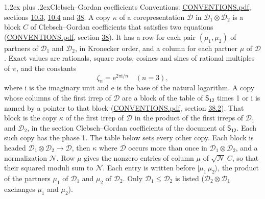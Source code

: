 \documentclass[10pt,a4paper]{article}
\makeatletter
\renewcommand\section{\@startsection{section}{1}{\z@}{-3ex plus -1ex minus -.2ex}%
  {1.2ex plus .2ex}{\normalfont\large\sffamily\bfseries\color{parttitle}}}
\numberwithin{equation}{section}
\newcommand{\grp}[1]{\mathsf{#1}}
\newcommand{\iunit}{\mathrm{i}}
\newcommand{\expe}{\mathrm{e}}
\newcommand{\rootunity}[1]{\zeta_{#1}}
\newcommand{\irrprod}{\otimes}
\newcommand{\mult}{\kappa}
\newcommand{\intx}{\mu}
\newcommand{\cgnorm}{\mathcal{N}}
\newcommand{\prodket}[2]{\lvert {#1}\,{#2}\rangle}
\makeatother
\begin{document}
\section{Clebsch--Gordan coefficients}\label{s:clebsch_gordan}
Conventions: \href{../../CONVENTIONS.pdf}{CONVENTIONS.pdf}, sections \href{../../../rotation/CONVENTIONS.pdf\#conv.10.3}{10.3}, \href{../../../rotation/CONVENTIONS.pdf\#conv.10.4}{10.4} and \href{../../CONVENTIONS.pdf\#conv.38}{38}.
\leavevmode\label{n:index.copy}\label{n:matrix.cg.stored}A copy $\mult$ of a corepresentation $\mathcal{D}$ in $\mathcal{D}_1\irrprod\mathcal{D}_2$ is a block $C$ of Clebsch--Gordan coefficients that satisfies two equations (\href{../../CONVENTIONS.pdf}{CONVENTIONS.pdf}, section \href{../../CONVENTIONS.pdf\#conv.38}{38}). \label{n:index.cg}It has a row for each pair $(\intx_1, \intx_2)$ of partners of $\mathcal{D}_1$ and $\mathcal{D}_2$, in Kronecker order, and a column for each partner $\intx$ of $\mathcal{D}$.
\leavevmode\label{n:constant.root}\label{n:index.root.order}Exact values are rationals, square roots, cosines and sines of rational multiples of $\pi$, and the constants
\begin{equation}\label{e:constants}\rootunity{n} = \expe^{2\pi\iunit/n}\quad(n = 3),\end{equation}
where $\iunit$ is the imaginary unit and $\expe$ is the base of the natural logarithm.
A copy whose columns of the first irrep of $\mathcal{D}$ are a block of the table of $\grp{S_{12}}$ times 1 or $\iunit$ is named by a pointer to that block (\href{../../CONVENTIONS.pdf}{CONVENTIONS.pdf}, section \href{../../CONVENTIONS.pdf\#conv.38.2}{38.2}). That block is the copy $\mult$ of the first irrep of $\mathcal{D}$ in the product of the first irreps of $\mathcal{D}_1$ and $\mathcal{D}_2$, in the section Clebsch--Gordan coefficients of the document of \href{../../../rotation/data/pdf/S12.pdf}{$\grp{S_{12}}$}. Each such copy has the phase 1. The table below sets every other copy.
Each block is headed $\mathcal{D}_1\irrprod\mathcal{D}_2\to\mathcal{D}$, then $\mult$ where $\mathcal{D}$ occurs more than once in $\mathcal{D}_1\irrprod\mathcal{D}_2$, and a normalization $\cgnorm$. Row $\intx$ gives the nonzero entries of column $\intx$ of $\sqrt{\cgnorm}\,C$, so that their squared moduli sum to $\cgnorm$. \label{n:vector.ket.product}Each entry is written before $\prodket{\intx_1}{\intx_2}$, the product of the partners $\intx_1$ of $\mathcal{D}_1$ and $\intx_2$ of $\mathcal{D}_2$. Only $\mathcal{D}_1 \le \mathcal{D}_2$ is listed ($\mathcal{D}_2\irrprod\mathcal{D}_1$ exchanges $\intx_1$ and $\intx_2$).
\end{document}
